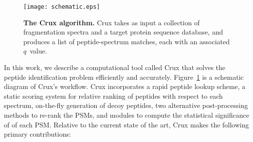 \documentclass[12pt]{article}
\begin{document}
\begin{figure}
\centering
\texttt{[image: schematic.eps]}
\caption{{\bf The Crux algorithm.}  Crux takes as input a collection
  of fragmentation spectra and a target protein sequence database, and
  produces a list of peptide-spectrum matches, each with an associated
  $q$~value.
  \label{figure:crux}}
\end{figure}

In this work, we describe a computational tool called Crux that solves
the peptide identification problem efficiently and accurately.  
Figure~\ref{figure:crux} is a schematic diagram of Crux's workflow.
Crux incorporates a rapid
peptide lookup scheme, a static scoring system for relative ranking of
peptides with respect to each spectrum, on-the-fly generation of decoy
peptides, two alternative post-processing methods to re-rank the PSMs,
and modules to compute the statistical significance of of each PSM.
Relative to the current state of the art, Crux makes the following
primary contributions:
\end{document}
